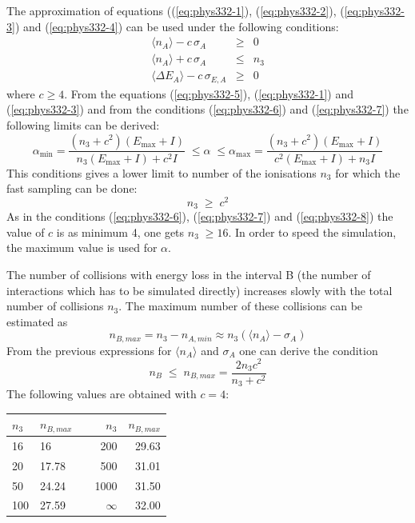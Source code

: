 \documentclass{article}
\newcommand{\Emax}{\ensuremath{E_{\mathrm{max}}}}
\begin{document}
The approximation of equations ((\ref{eq:phys332-1}),
(\ref{eq:phys332-2}), (\ref{eq:phys332-3}) and (\ref{eq:phys332-4})
can be used under the following conditions:
\begin{eqnarray}
\label{eq:phys332-6}
\langle n_A \rangle - c \, \sigma_A            & \geq & 0 \\
\label{eq:phys332-7}
\langle n_A \rangle + c \, \sigma_A            & \leq & n_3 \\
\label{eq:phys332-8}
\langle \Delta E_A \rangle - c \, \sigma_{E,A} & \geq & 0
\end{eqnarray}
where $c \geq 4$. From the equations (\ref{eq:phys332-5}),
(\ref{eq:phys332-1}) and (\ref{eq:phys332-3}) and from the conditions
(\ref{eq:phys332-6}) and (\ref{eq:phys332-7}) the following limits can
be derived:
\begin{equation}
\alpha_{\mathrm{min}} = \frac{(n_3 + c^2)(\Emax+I)}
                      {n_3 (\Emax + I) + c^2 I} \; \leq \alpha \; \leq
\alpha_{\mathrm{max}} = \frac{(n_3 + c^2)(\Emax+I)}
                      {c^2 (\Emax + I) + n_3 I}
\end{equation}
This conditions gives a lower limit to number of the ionisations $n_3$
for which the fast sampling can be done:
\begin{equation}
n_3 \; \geq \; c^2
\end{equation}
As in the conditions (\ref{eq:phys332-6}), (\ref{eq:phys332-7}) and
(\ref{eq:phys332-8}) the value of $c$ is as minimum 4, one gets $n_3
\; \geq 16$. In order to speed the simulation, the maximum value is
used for $\alpha$.

The number of collisions with energy loss in the interval B (the
number of interactions which has to be simulated directly) increases
slowly with the total number of collisions $n_3$. The maximum number
of these collisions can be estimated as
\begin{equation}
n_{B,max} = n_3 - n_{A,min} \approx n_3 (\langle n_A \rangle 
            - \sigma_A)
\end{equation}
From the previous expressions for $\langle n_A \rangle$ and $\sigma_A$
one can derive the condition
\begin{equation}
n_B \; \leq \; n_{B,max} = \frac{2 n_3 c^2}{n_3+c^2}
\end{equation}
The following values are obtained with $c=4$:

\begin{tabular}{llcrr}
$n_3$  & $n_{B,max}$ & & $n_3$  & $n_{B,max}$\\ \hline
16   & 16      & & 200  & 29.63\\
20   & 17.78   & & 500  & 31.01 \\
50   & 24.24   & & 1000 & 31.50 \\
100  & 27.59   & & $\infty$ & 32.00
\end{tabular}
\end{document}
